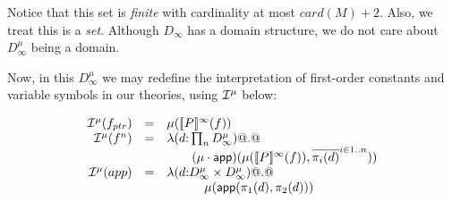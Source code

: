 \documentclass[preprint,nocopyrightspace,draft]{sigplanconf}
\begin{document}
\begin{itemize}
  Notice that this set is {\em finite} with cardinality at most $card(M) + 2$. Also, 
  we treat this is a {\em set}. Although $D_\infty$ has a domain structure, we do not 
  care about $D_\infty^\mu$ being a domain. 

  Now, in this $D_\infty^\mu$ we may redefine the interpretation of first-order constants
  and variable symbols in our theories, using ${\cal I}^\mu$ below:

   \newcommand{\mlinterp}[1]{{\cal I}^\mu(#1)}

  {\setlength{\arraycolsep}{2pt}  
  \[\begin{array}{rcl}
     \mlinterp{f_{ptr}} & = & \mu(\dbrace{P}^{\infty}(f)) \\  
   \mlinterp{f^{n}}  & = & \dlambda (d {:} \prod_{n}D_{\infty}^\mu) @.@  \\
                       &   & \quad\quad (\mu\cdot\dapp)(\mu(\dbrace{P}^{\infty}(f)),\oln{\pi_i(d)}{i \in 1..n})) \\

   \mlinterp{app}     & = & \dlambda (d {:} D_{\infty}^\mu \times D_{\infty}^\mu) @.@ \\ \
                      &   & \quad\qquad \mu(\dapp(\pi_1(d),\pi_2(d))) \\ \\


\end{array}\]}
\end{itemize}
\end{document}
